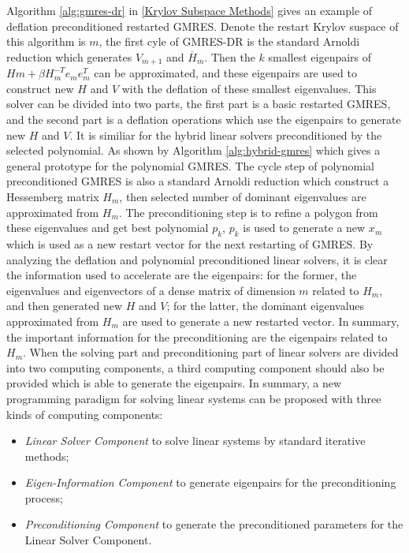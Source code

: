 Algorithm \ref{alg:gmres-dr} in \ref{Krylov Subspace Methods} gives an example of deflation preconditioned restarted GMRES. Denote the restart Krylov suspace of this algorithm is $m$, the first cyle of GMRES-DR is the standard Arnoldi reduction which generates $V_{m+1}$ and $\overline{H}_m$. Then the $k$ smallest eigenpairs of $Hm+\beta H_m^{-T}e_me_m^T$ can be approximated, and these eigenpairs are used to construct new $H$ and $V$ with the deflation of these smallest eigenvalues. This solver can be divided into two parts, the first part is a basic restarted GMRES, and the second part is a deflation operations which use the eigenpairs to generate new $H$ and $V$. It is similiar for the hybrid linear solvers preconditioned by the selected polynomial. As shown by Algorithm \ref{alg:hybrid-gmres} which gives a general prototype for the polynomial GMRES. The cycle step of polynomial preconditioned GMRES is also a standard Arnoldi reduction which construct a Hessemberg matrix $H_m$, then selected number of dominant eigenvalues are approximated from $H_m$. The preconditioning step is to refine a polygon from these eigenvalues and get best polynomial $p_k$, $p_k$ is used to generate a new $x_m$ which is used as a new restart vector for the next restarting of GMRES. By analyzing the deflation and polynomial preconditioned linear solvers, it is clear the information used to accelerate are the eigenpairs: for the former, the eigenvalues and eigenvectors of a dense matrix of dimension $m$ related to $H_m$, and then generated new $H$ and $V$; for the latter, the dominant eigenvalues approximated from $H_m$ are used to generate a new restarted vector. In summary, the important information for the preconditioning are the eigenpairs related to $H_m$.  When the solving part and preconditioning part of linear solvers are divided into two computing components, a third computing component should also be provided which is able to generate the eigenpairs. In summary, a new programming paradigm for solving linear systems can be proposed with three kinds of computing components:

\begin{itemize}
	\item \textit{Linear Solver Component} to solve linear systems by standard iterative methods;
	\item \textit{Eigen-Information Component} to generate eigenpairs for the preconditioning process;
	\item \textit{Preconditioning Component} to generate the preconditioned parameters for the Linear Solver Component.
\end{itemize}

